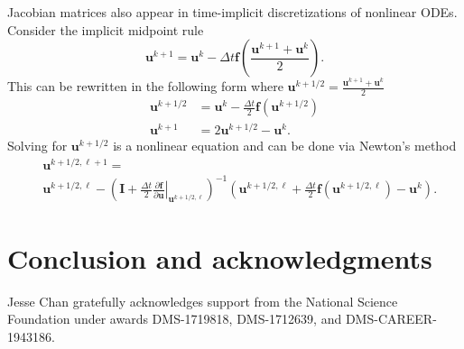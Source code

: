 \documentclass{article}
\newcommand{\pd}[2]{\frac{\partial#1}{\partial#2}}
\newcommand{\LRp}[1]{\left( #1 \right)}
\newcommand{\LRl}[1]{\left. #1 \right|}
\newcommand{\eq}[1]{\begin{align*}#1\end{align*}}
\begin{document}
Jacobian matrices also appear in time-implicit discretizations of nonlinear ODEs.  Consider the implicit midpoint rule 
\[
\bm{u}^{k+1} = \bm{u}^k - \Delta t \bm{f}\LRp{\frac{\bm{u}^{k+1} + \bm{u}^k}{2}}.
\]
This can be rewritten in the following form where $\bm{u}^{k+1/2} = \frac{\bm{u}^{k+1}+\bm{u}^k}{2}$
\eq{
\bm{u}^{k+1/2} &= \bm{u}^k - \frac{\Delta t}{2}\bm{f}\LRp{\bm{u}^{k+1/2}}\\
\bm{u}^{k+1} &= 2\bm{u}^{k+1/2} - \bm{u}^k.
}
Solving for $\bm{u}^{k+1/2}$ is a nonlinear equation and can be done via Newton's method
\eq{
&\bm{u}^{k+1/2,\ell+1} = \\
&\bm{u}^{k+1/2,\ell} - \LRp{\bm{I} + \frac{\Delta t}{2}\LRl{\pd{\bm{f}}{\bm{u}}}_{\bm{u}^{k+1/2,\ell}}}^{-1}\LRp{\bm{u}^{k+1/2,\ell} + \frac{\Delta t}{2}\bm{f}\LRp{\bm{u}^{k+1/2,\ell}} - \bm{u}^k}.
}


\section{Conclusion and acknowledgments}

Jesse Chan gratefully acknowledges support from the National Science Foundation under awards DMS-1719818, DMS-1712639, and DMS-CAREER-1943186.  



\end{document}
